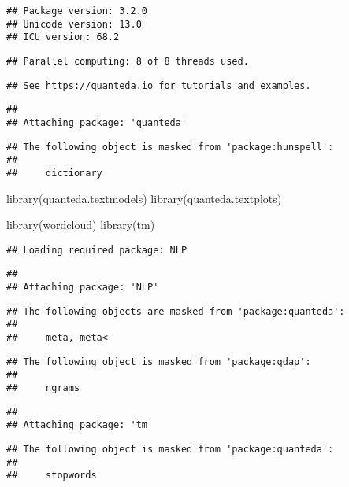 \documentclass[
]{article}
\newenvironment{Shaded}{\begin{snugshade}}{\end{snugshade}}
\newcommand{\FunctionTok}[1]{\textcolor[rgb]{0.00,0.00,0.00}{#1}}
\newcommand{\NormalTok}[1]{#1}
\begin{document}
\begin{verbatim}
## Package version: 3.2.0
## Unicode version: 13.0
## ICU version: 68.2
\end{verbatim}

\begin{verbatim}
## Parallel computing: 8 of 8 threads used.
\end{verbatim}

\begin{verbatim}
## See https://quanteda.io for tutorials and examples.
\end{verbatim}

\begin{verbatim}
## 
## Attaching package: 'quanteda'
\end{verbatim}

\begin{verbatim}
## The following object is masked from 'package:hunspell':
## 
##     dictionary
\end{verbatim}

\begin{Shaded}
\begin{Highlighting}[]
\FunctionTok{library}\NormalTok{(quanteda.textmodels)}
\FunctionTok{library}\NormalTok{(quanteda.textplots)}

\FunctionTok{library}\NormalTok{(wordcloud)}
\FunctionTok{library}\NormalTok{(tm)}
\end{Highlighting}
\end{Shaded}

\begin{verbatim}
## Loading required package: NLP
\end{verbatim}

\begin{verbatim}
## 
## Attaching package: 'NLP'
\end{verbatim}

\begin{verbatim}
## The following objects are masked from 'package:quanteda':
## 
##     meta, meta<-
\end{verbatim}

\begin{verbatim}
## The following object is masked from 'package:qdap':
## 
##     ngrams
\end{verbatim}

\begin{verbatim}
## 
## Attaching package: 'tm'
\end{verbatim}

\begin{verbatim}
## The following object is masked from 'package:quanteda':
## 
##     stopwords
\end{verbatim}
\end{document}
